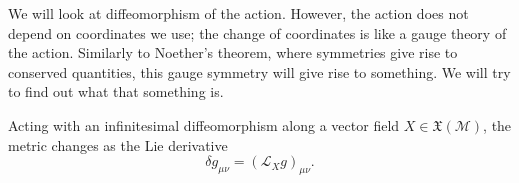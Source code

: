 We will look at diffeomorphism of the action. However, the action does not depend on coordinates we use; the change of coordinates is like a gauge theory of the action. Similarly to Noether's theorem, where symmetries give rise to conserved quantities, this gauge symmetry will give rise to something. We will try to find out what that something is.

\begin{claim} \label{claim:14-metric-change-diffeo}
  Acting with an infinitesimal diffeomorphism along a vector field $X \in \mathfrak{X}(\mathcal{M})$, the metric changes as the Lie derivative
  \begin{equation}
    \delta g_{\mu\nu} = (\mathcal{L}_X g)_{\mu\nu}.
  \end{equation}
\end{claim}
